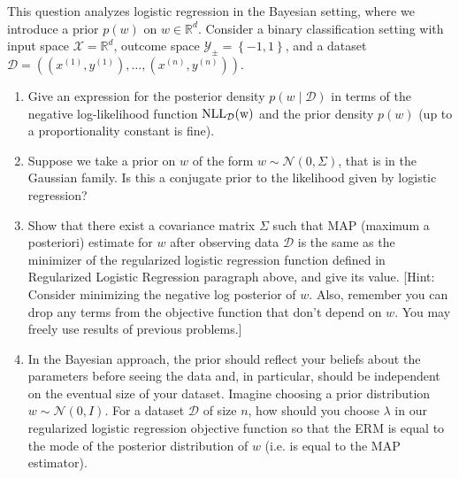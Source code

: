 \documentclass{article}
\newcommand{\nll}{\rm NLL}
\theoremstyle{plain}
\theoremstyle{definition}
\begin{document}
This question analyzes logistic regression in the Bayesian setting, where we introduce a prior $p(w)$ on  $w\in\mathbb{R}^{d}$. Consider a binary classification setting with input
space $\mathcal{X}=\mathbb{R}^{d}$, outcome space $\mathcal{Y}_{\pm}=\left\{ -1,1\right\} $,
and a dataset $\mathcal{D}=\left((x^{(1)},y^{(1)}),\ldots,(x^{(n)},y^{(n)})\right)$.
\begin{enumerate}
  \setcounter{enumi}{\value{saveenum}}
\item Give an expression for the posterior density $p(w\mid\mathcal{D})$ in terms
of the negative log-likelihood function $\nll_{\mathcal{D}}(w)$ and the prior density $p(w)$
(up to a proportionality constant is fine). 

\item Suppose we take a prior on $w$ of the form $w\sim\mathcal{N}(0,\Sigma)$, that is in the Gaussian family. Is this a conjugate prior to the likelihood given by logistic regression?


\item Show that there exist a covariance matrix $\Sigma$ such that MAP (maximum a posteriori) estimate for $w$
after observing data $\mathcal{D}$ is the same as the minimizer of the regularized
logistic regression function defined in Regularized Logistic Regression paragraph above, and give its value. {[}Hint: Consider minimizing the negative log posterior
of $w$. Also, remember you can drop any terms from the objective
function that don't depend on $w$. You may freely use results
of previous problems.{]} 


\item In the Bayesian approach, the prior should reflect your beliefs about
the parameters before seeing the data and, in particular, should be
independent on the eventual size of your dataset. Imagine choosing a prior distribution $w\sim\mathcal{N}(0,I)$. For a dataset $\mathcal{D}$
of size $n$, how should you choose $\lambda$ in our regularized
logistic regression objective function so that the ERM is equal
to the mode of the posterior distribution of $w$ (i.e. is equal to
the MAP estimator). 



\setcounter{saveenum}{\value{enumi}}
\end{enumerate}
\end{document}
